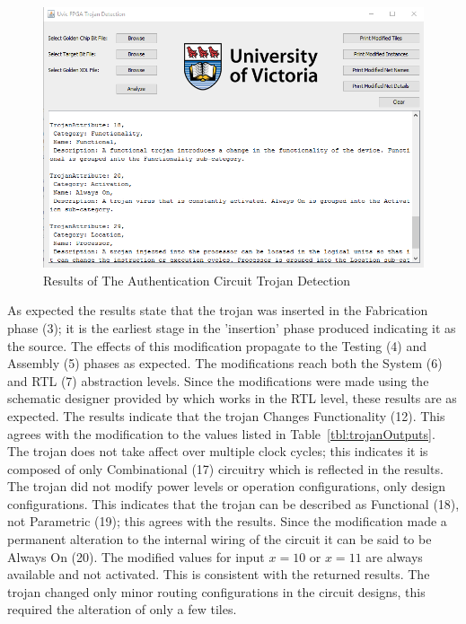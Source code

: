 \begin{figure}[h]
	\centering
	\includegraphics[width=1\linewidth]{Figures/backDoorResult}
	\caption[Results of The Authentication Circuit Trojan Detection]{Results of The Authentication Circuit Trojan Detection}
	\label{fig:backDoorResult}
\end{figure}
As expected the results state that the trojan was inserted in the Fabrication phase (3); it is the earliest stage in the 'insertion' phase produced indicating it as the source.
The effects of this modification propagate to the Testing (4) and Assembly (5) phases as expected.
The modifications reach both the System (6) and \acrfull{RTL} (7) abstraction levels.
Since the modifications were made using the schematic designer provided by \Xilinx which works in the \acrshort{RTL} level, these results are as expected.
The results indicate that the trojan Changes Functionality (12). 
This agrees with the modification to the values listed in Table~\ref{tbl:trojanOutputs}.
The trojan does not take affect over multiple clock cycles; this indicates it is composed of only Combinational (17) circuitry which is reflected in the results.
The trojan did not modify power levels or operation configurations, only design configurations.
This indicates that the trojan can be described as Functional (18), not Parametric (19); this agrees with the results.
Since the modification made a permanent alteration to the internal wiring of the circuit it can be said to be Always On (20).
The modified values for input $x=10$ or $x=11$ are always available and not activated.
This is consistent with the returned results.
The trojan changed only minor routing configurations in the circuit designs, this required the alteration of only a few tiles.
